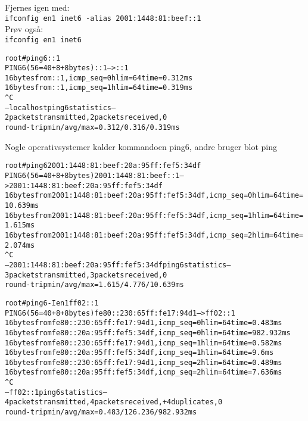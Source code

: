 \documentclass[Screen16to9,17pt]{foils}
\begin{document}
Fjernes igen med:\\
\verb+ifconfig en1 inet6 -alias 2001:1448:81:beef::1+\\
Prøv også:\\ \verb+ifconfig en1 inet6+


\begin{alltt}
\small
root# ping6 ::1
PING6(56=40+8+8 bytes) ::1 --> ::1
16 bytes from ::1, icmp_seq=0 hlim=64 time=0.312 ms
16 bytes from ::1, icmp_seq=1 hlim=64 time=0.319 ms
^C
--- localhost ping6 statistics ---
2 packets transmitted, 2 packets received, 0% packet loss
round-trip min/avg/max = 0.312/0.316/0.319 ms
\end{alltt}

Nogle operativsystemer kalder kommandoen ping6, andre bruger blot ping


\begin{alltt}
\footnotesize
root# ping6 2001:1448:81:beef:20a:95ff:fef5:34df
PING6(56=40+8+8 bytes) 2001:1448:81:beef::1 --> 2001:1448:81:beef:20a:95ff:fef5:34df
16 bytes from 2001:1448:81:beef:20a:95ff:fef5:34df, icmp_seq=0 hlim=64 time=10.639 ms
16 bytes from 2001:1448:81:beef:20a:95ff:fef5:34df, icmp_seq=1 hlim=64 time=1.615 ms
16 bytes from 2001:1448:81:beef:20a:95ff:fef5:34df, icmp_seq=2 hlim=64 time=2.074 ms
^C
--- 2001:1448:81:beef:20a:95ff:fef5:34df ping6 statistics ---
3 packets transmitted, 3 packets received, 0% packet loss
round-trip min/avg/max = 1.615/4.776/10.639 ms
\end{alltt}



\begin{alltt}
\small
root# ping6 -I en1 ff02::1
PING6(56=40+8+8 bytes) fe80::230:65ff:fe17:94d1 --> ff02::1
16 bytes from fe80::230:65ff:fe17:94d1, icmp_seq=0 hlim=64 time=0.483 ms
16 bytes from fe80::20a:95ff:fef5:34df, icmp_seq=0 hlim=64 time=982.932 ms
16 bytes from fe80::230:65ff:fe17:94d1, icmp_seq=1 hlim=64 time=0.582 ms
16 bytes from fe80::20a:95ff:fef5:34df, icmp_seq=1 hlim=64 time=9.6 ms
16 bytes from fe80::230:65ff:fe17:94d1, icmp_seq=2 hlim=64 time=0.489 ms
16 bytes from fe80::20a:95ff:fef5:34df, icmp_seq=2 hlim=64 time=7.636 ms
^C
--- ff02::1 ping6 statistics ---
4 packets transmitted, 4 packets received, +4 duplicates, 0% packet loss
round-trip min/avg/max = 0.483/126.236/982.932 ms
\end{alltt}
\end{document}
